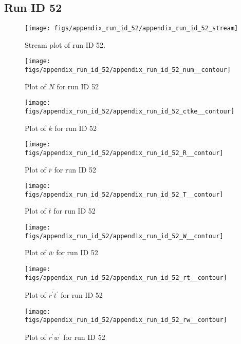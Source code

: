 \subsection{Run ID 52}
\begin{figure}[H]
\centering
\texttt{[image: figs/appendix\_run\_id\_52/appendix\_run\_id\_52\_stream]}
\caption{Stream plot of run ID 52.}
\label{fig:appendix_run_id_52_stream}
\end{figure}


\begin{figure}[H]
\centering
\texttt{[image: figs/appendix\_run\_id\_52/appendix\_run\_id\_52\_num\_\_contour]}
\caption{Plot of $N$ for run ID 52}
\label{fig:appendix_run_id_52_num__contour}
\end{figure}


\begin{figure}[H]
\centering
\texttt{[image: figs/appendix\_run\_id\_52/appendix\_run\_id\_52\_ctke\_\_contour]}
\caption{Plot of $k$ for run ID 52}
\label{fig:appendix_run_id_52_ctke__contour}
\end{figure}


\begin{figure}[H]
\centering
\texttt{[image: figs/appendix\_run\_id\_52/appendix\_run\_id\_52\_R\_\_contour]}
\caption{Plot of $\overline{r}$ for run ID 52}
\label{fig:appendix_run_id_52_R__contour}
\end{figure}


\begin{figure}[H]
\centering
\texttt{[image: figs/appendix\_run\_id\_52/appendix\_run\_id\_52\_T\_\_contour]}
\caption{Plot of $\overline{t}$ for run ID 52}
\label{fig:appendix_run_id_52_T__contour}
\end{figure}


\begin{figure}[H]
\centering
\texttt{[image: figs/appendix\_run\_id\_52/appendix\_run\_id\_52\_W\_\_contour]}
\caption{Plot of $\overline{w}$ for run ID 52}
\label{fig:appendix_run_id_52_W__contour}
\end{figure}


\begin{figure}[H]
\centering
\texttt{[image: figs/appendix\_run\_id\_52/appendix\_run\_id\_52\_rt\_\_contour]}
\caption{Plot of $\overline{r^\prime t^\prime}$ for run ID 52}
\label{fig:appendix_run_id_52_rt__contour}
\end{figure}


\begin{figure}[H]
\centering
\texttt{[image: figs/appendix\_run\_id\_52/appendix\_run\_id\_52\_rw\_\_contour]}
\caption{Plot of $\overline{r^\prime w^\prime}$ for run ID 52}
\label{fig:appendix_run_id_52_rw__contour}
\end{figure}


